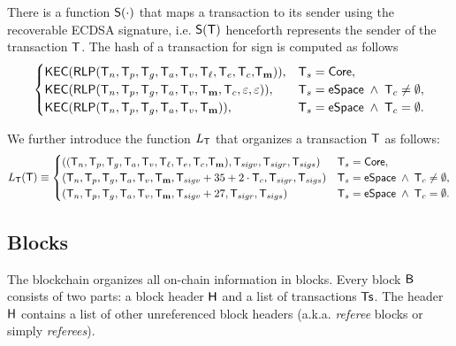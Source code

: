 There is a function $\mathsf{S}{\left({\cdot} \right)}$ that maps a transaction to its sender using the recoverable ECDSA signature,
i.e. $\mathsf{S}{\left({\textsf{T}} \right)}$ henceforth represents the sender of the transaction $\textsf{T}$. The hash of a transaction for sign is computed as follows
\begin{align}
	\begin{cases}
		\mathsf{KEC}(\mathsf{RLP}(\textsf{T}_n, \textsf{T}_p, \textsf{T}_g, \textsf{T}_a, \textsf{T}_v, {\textsf{T}_\ell,\textsf{T}_e,\textsf{T}_c,} \textsf{T}_{\bf m})), & \textsf{T}_s=\mathsf{Core},\\ 
		\mathsf{KEC}(\mathsf{RLP}(\textsf{T}_n, \textsf{T}_p, \textsf{T}_g, \textsf{T}_a, \textsf{T}_v, \textsf{T}_{\bf m}, \textsf{T}_c, \varepsilon,\varepsilon)), & \textsf{T}_s=\mathsf{eSpace} \;\wedge\;\textsf{T}_c\neq\emptyset,\\
		\mathsf{KEC}(\mathsf{RLP}(\textsf{T}_n, \textsf{T}_p, \textsf{T}_g, \textsf{T}_a, \textsf{T}_v, \textsf{T}_{\bf m})), & \textsf{T}_s=\mathsf{eSpace} \;\wedge\;\textsf{T}_c=\emptyset.\\
	\end{cases}
\end{align}


% 
We further introduce the function $L_{\textsf{T}}$ that organizes a transaction $\textsf{T}$ as follows:
\begin{align}\label{def:tx_prepare}
	L_{\textsf{T}}(\textsf{T})\equiv 
	\begin{cases}
	\left((\textsf{T}_n, \textsf{T}_p, \textsf{T}_g, \textsf{T}_a, \textsf{T}_v, {\textsf{T}_\ell,\textsf{T}_e,\textsf{T}_c,} \textsf{T}_{\bf m}), \textsf{T}_{sigv},\textsf{T}_{sigr},\textsf{T}_{sigs} \right) & \textsf{T}_s=\mathsf{Core}, \\
	\left(\textsf{T}_n, \textsf{T}_p, \textsf{T}_g, \textsf{T}_a, \textsf{T}_v, \textsf{T}_{\bf m}, \textsf{T}_{sigv}+35+2\cdot \textsf{T}_c,\textsf{T}_{sigr},\textsf{T}_{sigs} \right) & \textsf{T}_s=\mathsf{eSpace} \;\wedge\; \textsf{T}_c\neq\emptyset, \\
	\left(\textsf{T}_n, \textsf{T}_p, \textsf{T}_g, \textsf{T}_a, \textsf{T}_v, \textsf{T}_{\bf m}, \textsf{T}_{sigv}+27,\textsf{T}_{sigr},\textsf{T}_{sigs} \right) & \textsf{T}_s=\mathsf{eSpace} \;\wedge\; \textsf{T}_c=\emptyset.
	\end{cases}
\end{align}

\subsection{Blocks}
\label{sec:block}

The {\name} blockchain organizes all on-chain information in blocks.
%
Every {\name} block $\textsf{B}$ consists of two parts: a block header $\textsf{H}$ and a list of transactions $\textsf{Ts}$. The header $\textsf{H}$ contains a list of other unreferenced block headers (a.k.a. \emph{referee} blocks or simply \emph{referees}).

